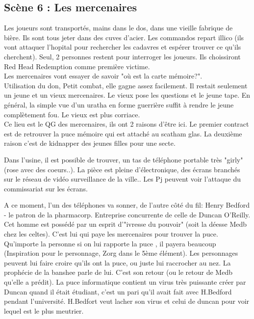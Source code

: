 \documentclass[oneside,12pt]{book}
\begin{document}
\begin{flushleft}
\section{Scène 6 : Les mercenaires}
Les joueurs sont transportés, mains dans le dos, dans une vieille fabrique de bière. Ils sont tous jeter dans des cuves d'acier. Les commandos repart illico (ils vont attaquer l'hopital pour rechercher les cadavres et espérer trouver ce qu'ils cherchent). Seul, 2 personnes restent pour interroger les joueurs. Ils choissiront Red Head Redemption comme première victime. \\
Les mercenaires vont essayer de savoir "où est la carte mémoire?". \\
Utilisation du don, Petit combat, elle gagne assez facilement. Il restait seulement un jeune et un vieux mercenaires. Le vieux pose les questions et le jeune tape. En général, la simple vue d'un uratha en forme guerrière suffit à rendre le jeune complètement fou. Le vieux est plus corriace. \\

Ce lieu est le QG des mercenaires, ils ont 2 raisons d'être ici. Le premier contract est de retrouver la puce mémoire qui est attaché au scatham glas. 
La deuxième raison c'est de kidnapper des jeunes filles pour une secte. 

Dans l'usine, il est possible de trouver, un tas de téléphone portable très "girly" (rose avec des coeurs..).  La pièce est pleine d'électronique, des écrans branchés sur le réseau de vidéo surveillance de la ville..
Les Pj peuvent voir l'attaque du commissariat sur les écrans. 

A ce moment, l'un des téléphones va sonner, de l'autre côté du fil: Henry Bedford - le patron de la pharmacorp. Entreprise concurrente de celle de Duncan O'Reilly.
Cet homme est possédé par un esprit d'"ivresse du pouvoir" (soit la déesse Medb chez les celtes). 
C'est lui qui paye les mercenaires pour trouver la puce. Qu'importe la personne si on lui rapporte la puce , il payera beaucoup (Inspiration pour le personnage, Zorg dans le 5ème élément). 
Les personnages peuvent lui faire croire qu'ils ont la puce, ou juste lui raccrocher au nez. La prophécie de la banshee parle de lui. C'est son retour (ou le retour de Medb qu'elle a prédit). La puce informatique contient un virus très puissante créer par Duncan quand il était étudiant, c'est un pari qu'il avait fait avec H.Bedford pendant l'université. H.Bedfort veut lacher son virus et celui de duncan pour voir lequel est le plus meutrier.   


\end{flushleft}
\end{document}
